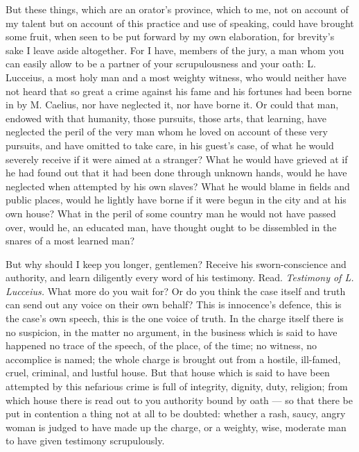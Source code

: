  But these things, which are an orator's province, which to me, not on account of my talent but on account of this practice and use of speaking, could have brought some fruit, when seen to be put forward by my own elaboration, for brevity's sake I leave aside altogether. For I have, members of the jury, a man whom you can easily allow to be a partner of your scrupulousness and your oath: L. Lucceius, a most holy man and a most weighty witness, who would neither have not heard that so great a crime against his fame and his fortunes had been borne in by M. Caelius, nor have neglected it, nor have borne it. Or could that man, endowed with that humanity, those pursuits, those arts, that learning, have neglected the peril of the very man whom he loved on account of these very pursuits, and have omitted to take care, in his guest's case, of what he would severely receive if it were aimed at a stranger? What he would have grieved at if he had found out that it had been done through unknown hands, would he have neglected when attempted by his own slaves? What he would blame in fields and public places, would he lightly have borne if it were begun in the city and at his own house? What in the peril of some country man he would not have passed over, would he, an educated man, have thought ought to be dissembled in the snares of a most learned man?

 But why should I keep you longer, gentlemen? Receive his sworn-conscience and authority, and learn diligently every word of his testimony. Read. \textit{Testimony of L. Lucceius.} What more do you wait for? Or do you think the case itself and truth can send out any voice on their own behalf? This is innocence's defence, this is the case's own speech, this is the one voice of truth. In the charge itself there is no suspicion, in the matter no argument, in the business which is said to have happened no trace of the speech, of the place, of the time; no witness, no accomplice is named; the whole charge is brought out from a hostile, ill-famed, cruel, criminal, and lustful house. But that house which is said to have been attempted by this nefarious crime is full of integrity, dignity, duty, religion; from which house there is read out to you authority bound by oath --- so that there be put in contention a thing not at all to be doubted: whether a rash, saucy, angry woman is judged to have made up the charge, or a weighty, wise, moderate man to have given testimony scrupulously.

